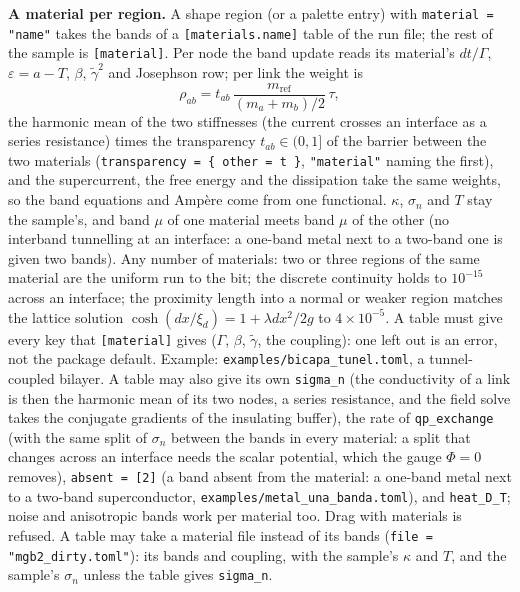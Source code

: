 \documentclass[11pt,a4paper]{article}
\newcommand{\code}[1]{\texttt{#1}}
\newcommand{\gt}{\tilde\gamma}
\begin{document}
\textbf{A material per region.} A shape region (or a palette entry) with \code{material = "name"} takes the bands of a
\code{[materials.name]} table of the run file; the rest of the sample is \code{[material]}. Per node the band update reads its
material's $dt/\Gamma$, $\varepsilon = a - T$, $\beta$, $\gt^2$ and Josephson row; per link the weight is
\begin{equation}
  \rho_{ab} = t_{ab}\,\frac{m_{\mathrm{ref}}}{(m_a + m_b)/2}\,\tau ,
\end{equation}
the harmonic mean of the two stiffnesses (the current crosses an interface as a series resistance) times the transparency
$t_{ab} \in (0, 1]$ of the barrier between the two materials (\code{transparency = \{ other = t \}}, \code{"material"} naming the
first), and the supercurrent, the free energy and the dissipation take the same weights, so the band equations and Amp\`ere come
from one functional. $\kappa$, $\sigma_n$ and $T$ stay the sample's, and band $\mu$ of one material meets band $\mu$ of the other
(no interband tunnelling at an interface: a one-band metal next to a two-band one is given two bands). Any number of materials:
two or three regions of the same material are the uniform run to the bit; the discrete continuity holds to $10^{-15}$ across an
interface; the proximity length into a normal or weaker region matches the lattice solution $\cosh(dx/\xi_d) = 1 + \lambda
dx^2/2g$ to $4\times10^{-5}$. A table must give every key that \code{[material]} gives ($\Gamma$, $\beta$, $\gt$, the coupling):
one left out is an error, not the package default.
Example: \code{examples/bicapa\_tunel.toml}, a tunnel-coupled bilayer. A table may also give its own \code{sigma\_n} (the
conductivity of a link is then the harmonic mean of its two nodes, a series resistance, and the field solve takes the conjugate
gradients of the insulating buffer), the rate of \code{qp\_exchange} (with the same split of $\sigma_n$ between the bands in every
material: a split that changes across an interface needs the scalar potential, which the gauge $\Phi = 0$ removes), \code{absent =
[2]} (a band absent from the material: a one-band metal next to a two-band superconductor, \code{examples/metal\_una\_banda.toml}),
and \code{heat\_D\_T}; noise and anisotropic bands work per material too. Drag with materials is refused. A table may take a
material file instead of its bands (\code{file = "mgb2\_dirty.toml"}): its bands and coupling, with the sample's $\kappa$ and $T$,
and the sample's $\sigma_n$ unless the table gives \code{sigma\_n}.
\end{document}
